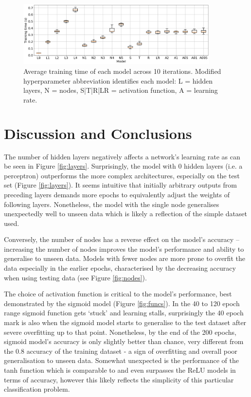 \documentclass[12pt]{article}
\begin{document}
\begin{figure}[H]
  \centering
  \includegraphics[width=0.9\textwidth]{figs/times.png}
  \caption{
    Average training time of each model across 10 iterations.
    Modified hyperparameter abbreviation identifies each model:
    L = hidden layers, N = nodes, S|T|R|LR = activation function,
    A = learning rate.
  }
  \label{fig:times}
\end{figure}

\vspace{-1.5em}
\section{Discussion and Conclusions}
\vspace{-1.5em}

The number of hidden layers negatively affects a network's learning rate as can be seen in Figure \ref{fig:layers}. Surprisingly, the model with 0 hidden layers (i.e. a perceptron) outperforms the more complex architectures, especially on the test set (Figure \ref{fig:layers}). It seems intuitive that initially arbitrary outputs from preceding layers demands more epochs to equivalently adjust the weights of following layers. Nonetheless, the model with the single node generalises unexpectedly well to unseen data which is likely a reflection of the simple dataset used.

Conversely, the number of nodes has a reverse effect on the model's accuracy -- increasing the number of nodes improves the model's performance and ability to generalise to unseen data. Models with fewer nodes are more prone to overfit the data especially in the earlier epochs, characterised by the decreasing accuracy when using testing data (see Figure \ref{fig:nodes}).

The choice of activation function is critical to the model's performance, best demonstrated by the sigmoid model (Figure \ref{fig:funcs}). In the 40 to 120 epoch range sigmoid function gets `stuck' and learning stalls, surprisingly the 40 epoch mark is also when the sigmoid model starts to generalise to the test dataset after severe overfitting up to that point. Nonetheless, by the end of  the 200 epochs, sigmoid model's accuracy is only slightly better than chance, very different from the 0.8 accuracy of the training dataset - a sign of overfitting and overall poor generalisation to unseen data.
Somewhat unexpected is the performance of the tanh function which is comparable to and even surpasses the ReLU models in terms of accuracy, however this likely reflects the simplicity of this particular classification problem.
\end{document}
